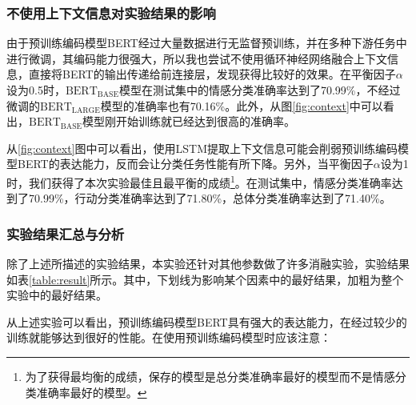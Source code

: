 

\subsubsection{不使用上下文信息对实验结果的影响}

由于预训练编码模型BERT经过大量数据进行无监督预训练，并在多种下游任务中进行微调，其编码能力很强大，所以我也尝试不使用循环神经网络融合上下文信息，直接将BERT的输出传递给前连接层，发现获得比较好的效果。在平衡因子$\alpha$设为0.5时，$\text{BERT}_\text{BASE}$模型在测试集中的情感分类准确率达到了70.99\%，不经过微调的$\text{BERT}_\text{LARGE}$模型的准确率也有70.16\%。此外，从图\ref{fig:context}中可以看出，$\text{BERT}_\text{BASE}$模型刚开始训练就已经达到很高的准确率。



从\ref{fig:context}图中可以看出，使用LSTM提取上下文信息可能会削弱预训练编码模型BERT的表达能力，反而会让分类任务性能有所下降。另外，当平衡因子$\alpha$设为1时，我们获得了本次实验最佳且最平衡的成绩\footnote{为了获得最均衡的成绩，保存的模型是总分类准确率最好的模型而不是情感分类准确率最好的模型。}。在测试集中，情感分类准确率达到了70.99\%，行动分类准确率达到了71.80\%，总体分类准确率达到了71.40\%。



\subsubsection{实验结果汇总与分析}

除了上述所描述的实验结果，本实验还针对其他参数做了许多消融实验，实验结果如表\ref{table:result}所示。其中，下划线为影响某个因素中的最好结果，加粗为整个实验中的最好结果。

\begin{landscape}
	
\end{landscape}


从上述实验可以看出，预训练编码模型BERT具有强大的表达能力，在经过较少的训练就能够达到很好的性能。在使用预训练编码模型时应该注意：


